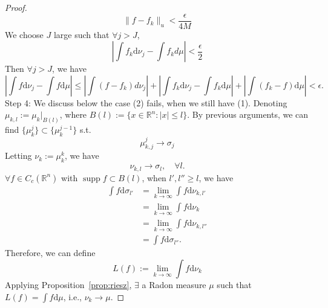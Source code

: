 \begin{proof}
        \begin{equation*}
            \| f-f_{k} \| _{u}< \frac{\epsilon}{4M}
        \end{equation*}
    We choose $J$ large such that $\forall j>J$,
        \begin{equation*}
            \left| \int f_{k}\mathrm{d}\nu _{j}-\int f_{k}d\mu  \right| < \frac{\epsilon}{2}
        \end{equation*}
    Then $\forall j>J$, we have
        \begin{equation*}
            \left| \int f\mathrm{d}\nu _{j}-\int f\mathrm{d}\mu  \right| 
            \leq \left| \int(f-f_{k})d\nu _{j}  \right| 
            +\left| \int f_{k}\mathrm{d}\nu _{j}- \int f_{k}\mathrm{d}\mu  \right| 
            +\left| \int(f_{k}-f)\mathrm{d}\mu  \right| <\epsilon.
        \end{equation*}
    Step 4:
    We discuss below the case (2) fails, when we still have (1).  Denoting $\mu _{k,l}:=\mu _{k}|_{B(l)}$, where $B(l):=\{ x \in \mathbb{R}^{n}:|x|\leq l \}.$
    By previous arguments, we can find $\{ \mu _{k}^{j} \}\subset \{ \mu _{k}^{j-1} \}$ s.t.
        \begin{equation*}
            \mu _{k,j}^{j}\to \sigma _{j}
        \end{equation*}
    Letting $\nu _{k}:=\mu _{k}^{k}$, we have
        \begin{equation*}
            \nu _{k,l}\to \sigma _{l},\quad \forall l.
        \end{equation*}
    $\forall f \in C_{c}(\mathbb{R}^{n})$ with $\operatorname{supp}f\subset B(l)$, when $l',l''\geq l$, we have
    \begin{align*}
        \int f\mathrm{d}\sigma _{l'} &=\lim_{ k \to \infty } \int f \mathrm{d}\nu _{k,l'} \\
        &=\lim_{ k \to \infty } \int f\mathrm{d}\nu _{k} \\
        &=\lim_{ k \to \infty } \int f\mathrm{d}\nu _{k,l''} \\
        &=\int f\mathrm{d}\sigma _{l''}.
    \end{align*}
    Therefore, we can define
        \begin{equation*}
            L(f):=\lim_{ k \to \infty } \int f\mathrm{d}\nu _{k}
        \end{equation*}
    Applying Proposition~\ref{prop:riesz}, $\exists$ a Radon measure $\mu$ such that $L(f)=\int f \mathrm{d}\mu$, i.e., $\nu _{k}\to \mu$.
    \end{proof}

